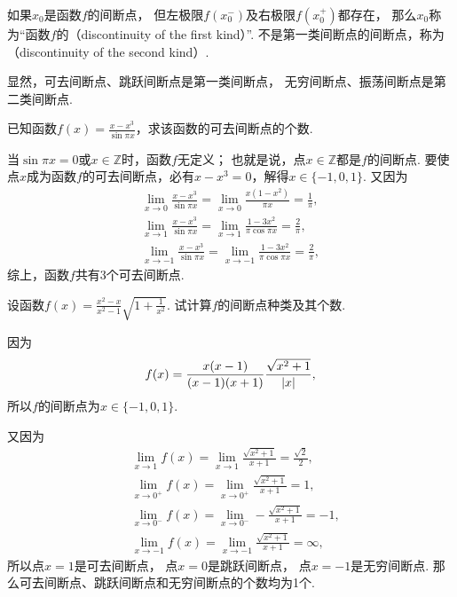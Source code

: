 如果\(x_0\)是函数\(f\)的间断点，
但左极限\(f(x_0^-)\)及右极限\(f(x_0^+)\)都存在，
那么\(x_0\)称为“函数\(f\)的（discontinuity of the first kind）”.
不是第一类间断点的间断点，称为（discontinuity of the second kind）.

显然，可去间断点、跳跃间断点是第一类间断点，
无穷间断点、振荡间断点是第二类间断点.

\begin{example}
已知函数\(f(x) = \frac{x-x^3}{\sin \pi x}\)，求该函数的可去间断点的个数.
\begin{solution}
当\(\sin \pi x = 0\)或\(x \in \mathbb{Z}\)时，函数\(f\)无定义；
也就是说，点\(x\in\mathbb{Z}\)都是\(f\)的间断点.
要使点\(x\)成为函数\(f\)的可去间断点，必有\(x-x^3=0\)，解得\(x\in\{-1,0,1\}\).
又因为\begin{gather*}
	\lim_{x\to0} \frac{x-x^3}{\sin \pi x}
	= \lim_{x\to0} \frac{x(1-x^2)}{\pi x}
	= \frac1\pi, \\
	\lim_{x\to1} \frac{x-x^3}{\sin \pi x}
	= \lim_{x\to1} \frac{1-3x^2}{\pi \cos \pi x}
	= \frac2\pi, \\
	\lim_{x\to-1} \frac{x-x^3}{\sin \pi x}
	= \lim_{x\to-1} \frac{1-3x^2}{\pi \cos \pi x}
	= \frac2\pi,
\end{gather*}
综上，函数\(f\)共有3个可去间断点.
\end{solution}
\end{example}

\begin{example}
设函数\(f(x) = \frac{x^2-x}{x^2-1}\sqrt{1+\frac{1}{x^2}}\).
试计算\(f\)的间断点种类及其个数.
\begin{solution}
因为\[
	f(x) = \frac{x(x-1)}{(x-1)(x+1)} \frac{\sqrt{x^2+1}}{\abs{x}},
\]
所以\(f\)的间断点为\(x\in\{-1,0,1\}\).

又因为\begin{align*}
	&\lim_{x\to1} f(x)
	= \lim_{x\to1} \frac{\sqrt{x^2+1}}{x+1}
	= \frac{\sqrt{2}}{2}, \\
	&\lim_{x\to0^+} f(x)
	= \lim_{x\to0^+} \frac{\sqrt{x^2+1}}{x+1}
	= 1, \\
	&\lim_{x\to0^-} f(x)
	= \lim_{x\to0^-} -\frac{\sqrt{x^2+1}}{x+1}
	= -1, \\
	&\lim_{x\to-1} f(x)
	= \lim_{x\to-1} \frac{\sqrt{x^2+1}}{x+1}
	= \infty,
\end{align*}
所以点\(x=1\)是可去间断点，
点\(x=0\)是跳跃间断点，
点\(x=-1\)是无穷间断点.
那么可去间断点、跳跃间断点和无穷间断点的个数均为1个.
\end{solution}
\end{example}


